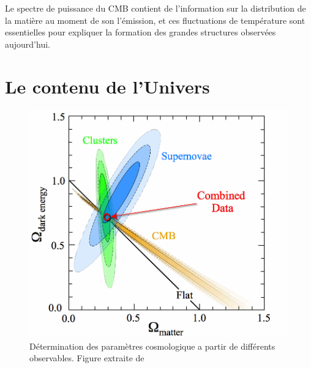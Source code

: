 
Le spectre de puissance du \ac{CMB} contient de l'information sur la distribution de la matière au moment de son l'émission, et ces fluctuations de température sont essentielles pour expliquer la formation des grandes structures observées aujourd'hui.

\section{Le contenu de l'Univers}
\label{cosmoparam}

\begin{figure}
        \includegraphics[width=.95\linewidth]{img/01/cosmoparam.png} 
        \caption[Determination des paramètres cosmologique]{Détermination des paramètres cosmologique a partir de différents observables. Figure extraite de \cite{2008ApJ...686..749K}}
 		\label{fig:cosmoparam}
\end{figure}



